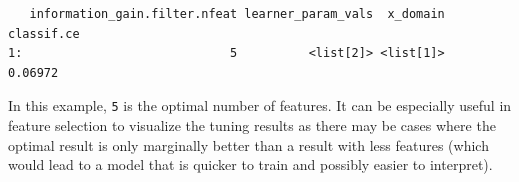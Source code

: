 \begin{Shaded}
\begin{Highlighting}[]
\OtherTok{=} \NormalTok{(}\NormalTok{, } \NormalTok{(}\NormalTok{),}
   \NormalTok{(}\SpecialCharTok{$}

\OtherTok{=} \SpecialCharTok{\%\textgreater{}\textgreater{}\%} \NormalTok{(}\NormalTok{, }\NormalTok{(}\NormalTok{)))}

\OtherTok{=} \NormalTok{(}\NormalTok{(}
  \NormalTok{(}\NormalTok{, } \NormalTok{), } \NormalTok{)}
\SpecialCharTok{$}
\end{Highlighting}
\end{Shaded}

\begin{verbatim}
   information_gain.filter.nfeat learner_param_vals  x_domain classif.ce
1:                             5          <list[2]> <list[1]>    0.06972
\end{verbatim}

In this example, \texttt{5} is the optimal number of features. It can be
especially useful in feature selection to visualize the tuning results
as there may be cases where the optimal result is only marginally better
than a result with less features (which would lead to a model that is
quicker to train and possibly easier to interpret).

\begin{Shaded}
\begin{Highlighting}[]
\end{Highlighting}
\end{Shaded}


